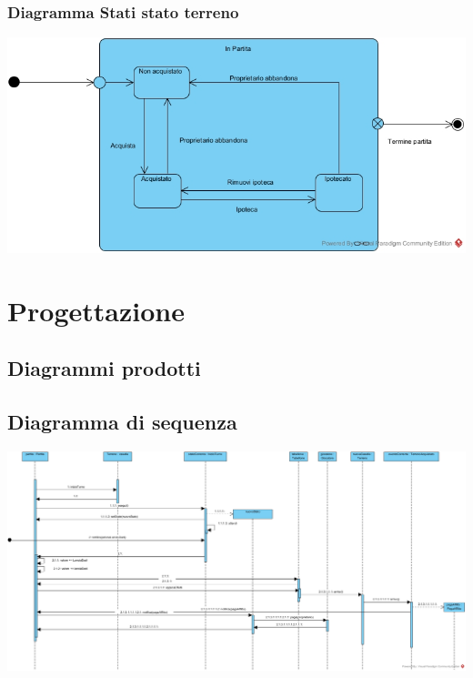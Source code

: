 \documentclass{article}
\begin{document}
\subsubsection{Diagramma Stati stato terreno}
\includegraphics[width=\textwidth]{DiagrammaStatiStatoTerreno}



\section{Progettazione}
\subsection{Diagrammi prodotti}
\subsection{Diagramma di sequenza}
\href{https://github.com/UnimibSoftEngCourse2022/progetto-monopoly-1-gangoffour2/blob/feat/doc/doc/img/DiagrammaDiSequenzaDiProgettazioneTurnoGiocatore.jpg?raw=true}
	{\includegraphics[width=\textwidth]{DiagrammaDiSequenzaDiProgettazioneTurnoGiocatore}}
\end{document}

